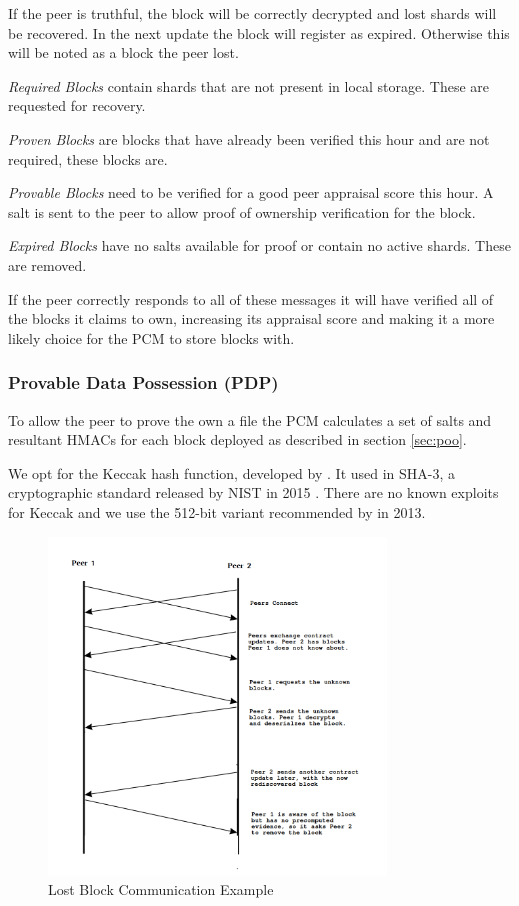 \documentclass[11pt, a4paper, twocolumn, twoside]{report}
\begin{document}
If the peer is truthful, the block will be correctly decrypted and lost shards will be recovered. In the next update the block will register as expired. Otherwise this will be noted as a block the peer lost.

\emph{Required Blocks} contain shards that are not present in local storage. These are requested for recovery.

\emph{Proven Blocks} are blocks that have already been verified this hour and are not required, these blocks are.

\emph{Provable Blocks} need to be verified for a good peer appraisal score this hour. A salt is sent to the peer to allow proof of ownership verification for the block.

\emph{Expired Blocks} have no salts available for proof or contain no active shards. These are removed.

If the peer correctly responds to all of these messages it will have verified all of the blocks it claims to own, increasing its appraisal score and making it a more likely choice for the PCM to store blocks with.

\subsubsection{Provable Data Possession (PDP)}

To allow the peer to prove the own a file the PCM calculates a set of salts and resultant HMACs for each block deployed as described in section \ref{sec:poo}.

We opt for the Keccak hash function, developed by \cite{bertoni2009keccak}. It used in SHA-3, a cryptographic standard released by NIST in 2015 \citep{paul2015nist}. There are no known exploits for Keccak and we use the 512-bit variant recommended by \cite{bertoni2009keccak} in 2013.

\begin{figure}[ht]
 \centering
 \includegraphics[width=0.8\textwidth]{lost-block}
 \caption{Lost Block Communication Example}
 \label{fig:lost-block}
\end{figure}
\end{document}

